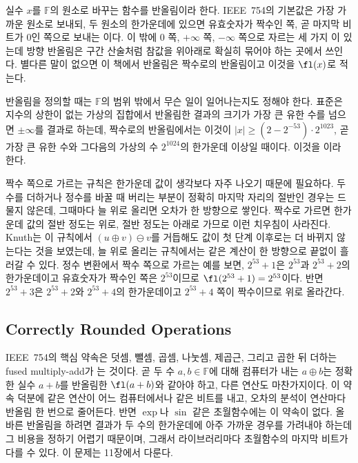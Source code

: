 실수 $x$를 $\mathbb F$의 원소로 바꾸는 함수를 반올림이라 한다. IEEE~754의 기본값은 가장 가까운 원소로 보내되, 두 원소의 한가운데에 있으면 유효숫자가 짝수인 쪽, 곧 마지막 비트가 $0$인 쪽으로 보내는 이다. 이 밖에 $0$ 쪽, $+\infty$ 쪽, $-\infty$ 쪽으로 자르는 세 가지 이 있는데 방향 반올림은 구간 산술처럼 참값을 위아래로 확실히 묶어야 하는 곳에서 쓰인다. 별다른 말이 없으면 이 책에서 반올림은 짝수로의 반올림이고 이것을 $\fl(x)$로 적는다.

반올림을 정의할 때는 $\mathbb F$의 범위 밖에서 무슨 일이 일어나는지도 정해야 한다. 표준은 지수의 상한이 없는 가상의 집합에서 반올림한 결과의 크기가 가장 큰 유한 수를 넘으면 $\pm\infty$를 결과로 하는데, 짝수로의 반올림에서는 이것이 $|x|\ge(2-2^{-53})\cdot2^{1023}$, 곧 가장 큰 유한 수와 그다음의 가상의 수 $2^{1024}$의 한가운데 이상일 때이다. 이것을 이라 한다.

짝수 쪽으로 가르는 규칙은 한가운데 값이 생각보다 자주 나오기 때문에 필요하다. 두 수를 더하거나 정수를 바꿀 때 버리는 부분이 정확히 마지막 자리의 절반인 경우는 드물지 않은데, 그때마다 늘 위로 올리면 오차가 한 방향으로 쌓인다. 짝수로 가르면 한가운데 값의 절반 정도는 위로, 절반 정도는 아래로 가므로 이런 치우침이 사라진다. Knuth는 이 규칙에서 $(u\oplus v)\ominus v$를 거듭해도 값이 첫 단계 이후로는 더 바뀌지 않는다는 것을 보였는데, 늘 위로 올리는 규칙에서는 같은 계산이 한 방향으로 끝없이 흘러갈 수 있다\cite{knuth1997taocp2}. 정수 변환에서 짝수 쪽으로 가르는 예를 보면, $2^{53}+1$은 $2^{53}$과 $2^{53}+2$의 한가운데이고 유효숫자가 짝수인 쪽은 $2^{53}$이므로 $\fl(2^{53}+1)=2^{53}$이다. 반면 $2^{53}+3$은 $2^{53}+2$와 $2^{53}+4$의 한가운데이고 $2^{53}+4$ 쪽이 짝수이므로 위로 올라간다.

\subsection{Correctly Rounded Operations}

IEEE~754의 핵심 약속은 덧셈, 뺄셈, 곱셈, 나눗셈, 제곱근, 그리고 곱한 뒤 더하는 fused multiply-add가 는 것이다. 곧 두 수 $a,b\in\mathbb F$에 대해 컴퓨터가 내는 $a\oplus b$는 정확한 실수 $a+b$를 반올림한 $\fl(a+b)$와 같아야 하고, 다른 연산도 마찬가지이다\cite{ieee754-2019}. 이 약속 덕분에 같은 연산이 어느 컴퓨터에서나 같은 비트를 내고, 오차의 분석이 연산마다 반올림 한 번으로 줄어든다. 반면 $\exp$나 $\sin$ 같은 초월함수에는 이 약속이 없다. 올바른 반올림을 하려면 결과가 두 수의 한가운데에 아주 가까운 경우를 가려내야 하는데 그 비용을 정하기 어렵기 때문이며, 그래서 라이브러리마다 초월함수의 마지막 비트가 다를 수 있다. 이 문제는 11장에서 다룬다.

